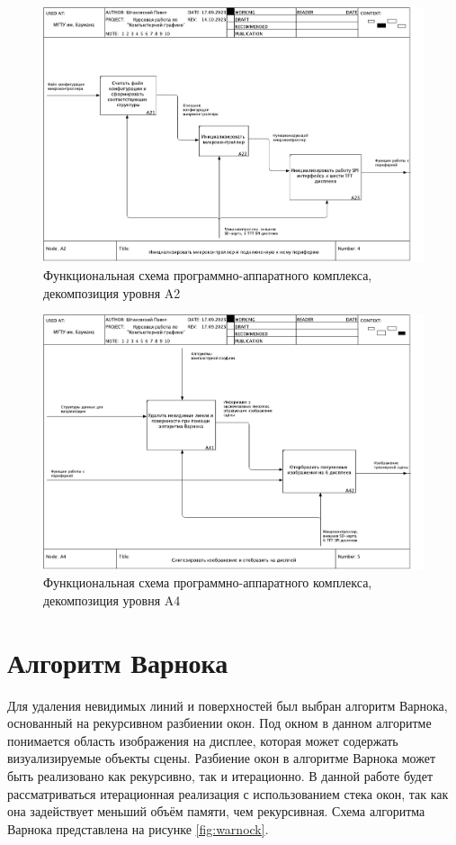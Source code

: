 \begin{figure}[H]
	\centering
	\includegraphics[height=0.45\textheight]{inc/img/04_A2.pdf}
	\caption{Функциональная схема программно-аппаратного комплекса, декомпозиция уровня A2}
	\label{fig:a2}
\end{figure}

\begin{figure}[H]
	\centering
	\includegraphics[height=0.45\textheight]{inc/img/05_A4.pdf}
	\caption{Функциональная схема программно-аппаратного комплекса, декомпозиция уровня A4}
	\label{fig:a4}
\end{figure}

\section{Алгоритм Варнока}
Для удаления невидимых линий и поверхностей был выбран алгоритм Варнока, основанный на рекурсивном разбиении окон. 
Под окном в данном алгоритме понимается область изображения на дисплее, которая может содержать визуализируемые объекты сцены. 
Разбиение окон в алгоритме Варнока может быть реализовано как рекурсивно, так и итерационно. 
В данной работе будет рассматриваться итерационная реализация с использованием стека окон, так как она задействует меньший объём памяти, чем рекурсивная.
Схема алгоритма Варнока представлена на рисунке \ref{fig:warnock}.

